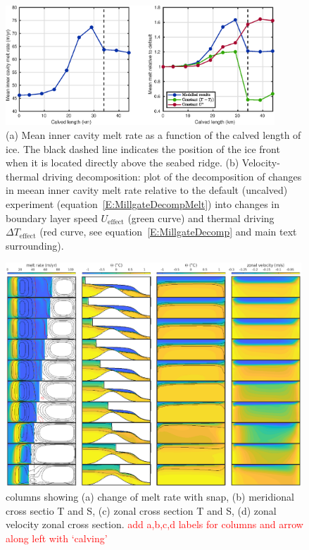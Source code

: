 \documentclass[draft]{agujournal2019}
\newcommand{\red}[1]{\textcolor{red}{#1}}
\begin{document}
\begin{figure}
    \centering
    \includegraphics[width = 0.9\textwidth]{../make_figures/plots/figure4.eps}
    \caption{(a) Mean inner cavity melt rate as a function of the calved length of ice. The black dashed line indicates the position of the ice front when it is located directly above the seabed ridge. (b) Velocity-thermal driving decomposition: plot of the decomposition of changes in meean inner cavity melt rate relative to the default (uncalved) experiment (equation~\eqref{E:MillgateDecompMelt}) into changes in boundary layer speed $U_\text{effect}$ (green curve) and thermal driving $\Delta T_{\text{effect}}$ (red curve, see equation~\eqref{E:MillgateDecomp} and main text surrounding).}
    \label{fig:figure4}
\end{figure}

\begin{figure}
    \centering
    \includegraphics[width = 0.99\textwidth]{../make_figures/plots/figure5.eps}
    \caption{columns showing (a) change of melt rate with snap, (b) meridional cross sectio T and S, (c) zonal cross section T and S, (d) zonal velocity zonal cross section. \red{add a,b,c,d labels for columns and arrow along left with `calving'}}
    \label{fig:figure5}
\end{figure}
\end{document}
